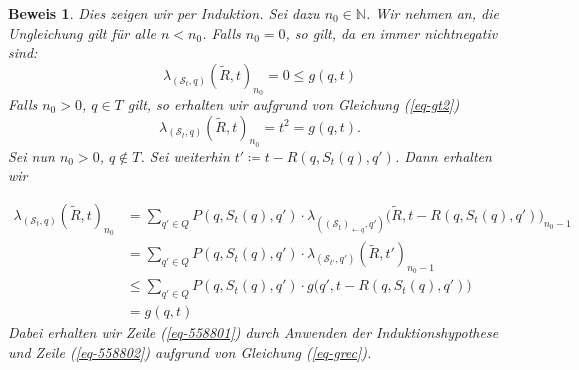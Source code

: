 \documentclass[a4paper]{article}
\newcommand{\mc}{Markow-Kette}
\theoremstyle{nonumberplain}
\newtheorem{beweis}{Beweis}
\begin{document}
\begin{beweis}
	Dies zeigen wir per Induktion. Sei dazu $n_0 \in \mathbb{N}$. Wir nehmen an, die Ungleichung gilt für alle $n<n_0$.
	Falls $n_0 = 0$, so gilt, da \vt{}en immer nichtnegativ sind:
	\[
		\lambda_{(\mathcal{S}_t,q)}(\tilde{R},t)_{n_0} = 0 \leq g(q,t)
	\]
	Falls $n_0 > 0$, $q\in T$ gilt, so erhalten wir aufgrund von Gleichung (\ref{eq-gt2})
	\[
	\lambda_{(\mathcal{S}_t,q)}(\tilde{R},t)_{n_0} = t^2 = g(q,t)\text{.}
	\]
	Sei nun $n_0 > 0$, $q\notin T$. Sei weiterhin $t' \coloneqq t - R(q,S_t(q),q')$. Dann erhalten wir
	
	\begin{align}
	\lambda_{(\mathcal{S}_t,q)}(\tilde{R},t)_{n_0} &= \sum_{q' \in Q} P(q,S_t(q),q') \cdot \lambda_{((\mathcal{S}_t)_{\leftarrow q},q')}\big(\tilde{R},t - R(q,S_t(q),q')\big)_{n_0-1} \\
	&= \sum_{q' \in Q} P(q,S_t(q),q') \cdot \lambda_{(\mathcal{S}_{t'},q')}(\tilde{R},t')_{n_0-1}\\
	&\leq \sum_{q' \in Q} P(q,S_t(q),q') \cdot g\big(q',t -R(q,S_t(q),q')\big) \label{eq-558801}\\
	&= g(q,t) \label{eq-558802}
	\end{align}
	Dabei erhalten wir Zeile (\ref{eq-558801}) durch Anwenden der Induktionshypothese und Zeile (\ref{eq-558802}) aufgrund von Gleichung (\ref{eq-grec}).
	\begin{comment}
	Die resultierende \mc{} $M_{S_t}$, obgleich sie i.A. unendlich sein kann, weist einen eindeutigen \expect{} und eine eindeutige \var{} bezüg\-lich der Kantenbewertung $\tilde{R}$ auf, da letztere beschränkt ist und wir angenommen haben, dass der MDP $M$ unter jedem Scheduler in einer \mc{} resultiert, in der von jedem Zustand ein Zielzustand erreichbar ist. Nach Lemma \ref{lem-vtqf} ist dann auch die \vt{} eindeutig definiert. Die \vt{}en von $M_{S_t}$ berechnen sich insbesondere durch die folgenden Gleichungen:
	\begin{align*}
		\forall & t \in \mathbb{R}, q \notin T : \\
		& \mvt_{(\mathcal{S}_t,q)}(\tilde{R},t) = \sum_{q' \in Q} P(q,S_t(q),q') \cdot \mvt_{((\mathcal{S}_t)_{\leftarrow q},q)}\big(\tilde{R},t - R(q,S_t(q),q')\big) \\
		\forall & t \in \mathbb{R}, q \in T : \\
		& \mvt_{(\mathcal{S}_t,q)}(\tilde{R},t) = t^2
	\end{align*}
	Betrachten wir Gleichung (\ref{eq-grec}), so sehen wir, dass mit $\mvt_{(\mathcal{S}_t,q)}(\tilde{R},t) = g(q,t)$ die Funktion $g$ uns eine Lösung des Gleichungssystems gibt. Des Weiteren beschreiben diese Gleichungen eine Reihe, deren Wert, falls er existiert, eindeutig bestimmt ist. Da die Lösung eindeutig sein muss, gilt die Behauptung.
	\end{comment}

\end{beweis}
\end{document}
